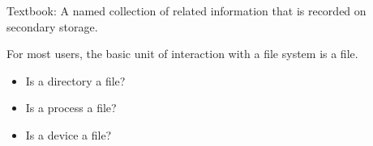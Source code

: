 \begin{slide}


    Textbook: A named collection of related information that is recorded on secondary storage.
    \bigskip

    For most users, the basic unit of interaction with a file system is a file.
    \bigskip

    \begin{itemize}
        \item Is a directory a file?
        \item Is a process a file?
        \item Is a device a file?
    \end{itemize}

\end{slide}

